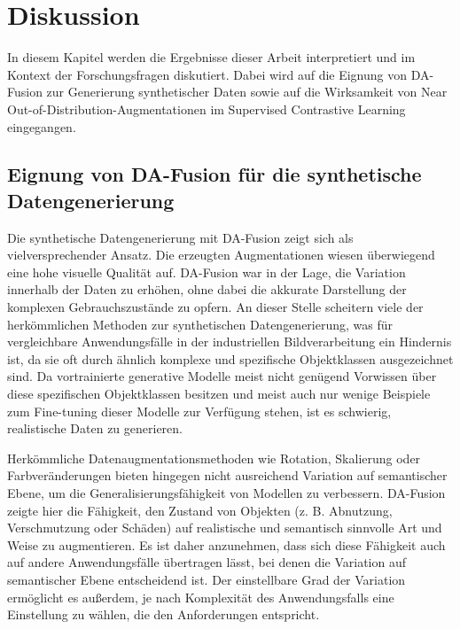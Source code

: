 \chapter{Diskussion} \label{ch:discussion} %

In diesem Kapitel werden die Ergebnisse dieser Arbeit interpretiert und im Kontext der Forschungsfragen diskutiert. Dabei wird auf die Eignung von DA-Fusion zur Generierung synthetischer Daten sowie auf die Wirksamkeit von Near Out-of-Distribution-Augmentationen im Supervised Contrastive Learning eingegangen.

\section{Eignung von DA-Fusion für die synthetische Datengenerierung} \label{sec:da-fusion-discussion}

Die synthetische Datengenerierung mit DA-Fusion zeigt sich als vielversprechender Ansatz. Die erzeugten Augmentationen wiesen überwiegend eine hohe visuelle Qualität auf. DA-Fusion war in der Lage, die Variation innerhalb der Daten zu erhöhen, ohne dabei die akkurate Darstellung der komplexen Gebrauchszustände zu opfern. An dieser Stelle scheitern viele der herkömmlichen Methoden zur synthetischen Datengenerierung, was für vergleichbare Anwendungsfälle in der industriellen Bildverarbeitung ein Hindernis ist, da sie oft durch ähnlich komplexe und spezifische Objektklassen ausgezeichnet sind. Da vortrainierte generative Modelle meist nicht genügend Vorwissen über diese spezifischen Objektklassen besitzen \parencite{Fan2023scalingsyntheticimages} und meist auch nur wenige Beispiele zum Fine-tuning dieser Modelle zur Verfügung stehen, ist es schwierig, realistische Daten zu generieren.

Herkömmliche Datenaugmentationsmethoden wie Rotation, Skalierung oder Farbveränderungen bieten hingegen nicht ausreichend Variation auf semantischer Ebene, um die Generalisierungsfähigkeit von Modellen zu verbessern. DA-Fusion zeigte hier die Fähigkeit, den Zustand von Objekten (z. B. Abnutzung, Verschmutzung oder Schäden) auf realistische und semantisch sinnvolle Art und Weise zu augmentieren. Es ist daher anzunehmen, dass sich diese Fähigkeit auch auf andere Anwendungsfälle übertragen lässt, bei denen die Variation auf semantischer Ebene entscheidend ist. Der einstellbare Grad der Variation ermöglicht es außerdem, je nach Komplexität des Anwendungsfalls eine Einstellung zu wählen, die den Anforderungen entspricht.


